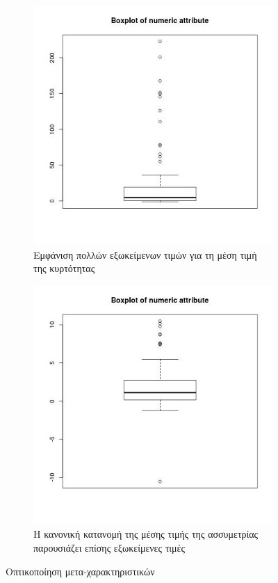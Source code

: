 \documentclass[]{article}
\numberwithin{equation}{section}		%
\numberwithin{figure}{section}			%
\numberwithin{table}{section}				%
\begin{document}
\begin{figure}[H]
    	\medskip
    	\begin{subfigure}{0.48\textwidth}
    		\includegraphics[width=\linewidth]{KurtosisMean_boxplot.jpg}
    		\caption{Εμφάνιση πολλών εξωκείμενων τιμών για τη μέση τιμή της κυρτότητας} \label{fig:e}
    	\end{subfigure}\hspace*{\fill}
    	\begin{subfigure}{0.48\textwidth}
    		\includegraphics[width=\linewidth]{SkewnessMean_boxplot.jpg}
    		\caption{Η κανονική κατανομή της μέσης τιμής της ασσυμετρίας παρουσιάζει επίσης εξωκείμενες τιμές} \label{fig:f}
    	\end{subfigure}
    	
    	\caption{Οπτικοποίηση μετα-χαρακτηριστικών} \label{fig:1}
    \end{figure}
    
\end{document}
